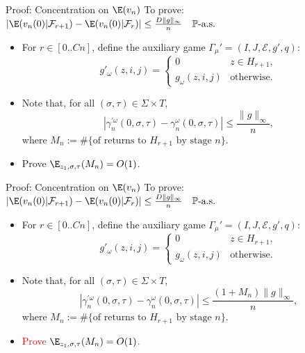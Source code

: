 \begin{frame}{Proof: Concentration on $\E(v_n)$}
  To prove: $|\E (v_n(0)|\mathcal{F}_{r+1}) - \E (v_n(0)|\mathcal{F}_r)| \leq \frac{D\|g\|_{\infty}}{n} \quad \mathbb{P}\text{-a.s.}$
  \vspace{0.5cm}

  
  \vspace{0.2cm}
  \begin{itemize}
    \item For $r \in [0..Cn]$, define the auxiliary game $\Gamma_{\mu}' = (I, J, \mathcal{E}, g', q)$:
    \[
      g'_{\omega}(z, i, j) = \begin{cases}
                                0          &   z \in H_{r+1},\\
                                g_{\omega}(z, i, j) & \text{otherwise} .
                              \end{cases}
    \]
    \item Note that, for all $(\sigma, \tau) \in \Sigma \times T$,
    \[
      |\gamma_n^{'\omega}(0, \sigma, \tau) - \gamma_n^{\omega}(0, \sigma, \tau)| \leq \frac{\|g\|_{\infty}}{n},
    \]
    where $M_n := \#\{\text{of returns to } H_{r+1} \text{ by stage } n\}$.
    \item Prove $\E_{z_1, \sigma, \tau}(M_n) = O(1)$.
  \end{itemize}
\end{frame}

\begin{frame}{Proof: Concentration on $\E(v_n)$}
  To prove: $|\E (v_n(0)|\mathcal{F}_{r+1}) - \E (v_n(0)|\mathcal{F}_r)| \leq \frac{D\|g\|_{\infty}}{n} \quad \mathbb{P}\text{-a.s.}$
  \vspace{0.5cm}

  
  \vspace{0.2cm}
  \begin{itemize}
    \item For $r \in [0..Cn]$, define the auxiliary game $\Gamma_{\mu}' = (I, J, \mathcal{E}, g', q)$:
    \[
      g'_{\omega}(z, i, j) = \begin{cases}
                                0          &   z \in H_{r+1},\\
                                g_{\omega}(z, i, j) & \text{otherwise} .
                              \end{cases}
    \]
    \item Note that, for all $(\sigma, \tau) \in \Sigma \times T$,
    \[
      |\gamma_n^{'\omega}(0, \sigma, \tau) - \gamma_n^{\omega}(0, \sigma, \tau)| \leq \frac{(1+M_n)\|g\|_{\infty}}{n},
    \]
    where $M_n := \#\{\text{of returns to } H_{r+1} \text{ by stage } n\}$.
    \item \textcolor<2->{red}{Prove $\E_{z_1, \sigma, \tau}(M_n) = O(1)$.}
  \end{itemize}
\end{frame}

